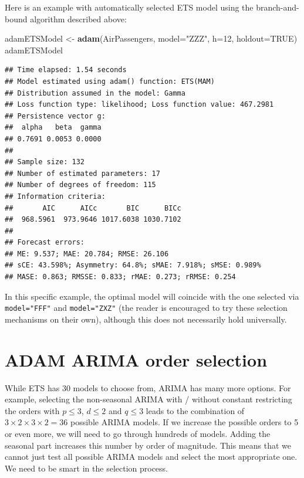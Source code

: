 \documentclass[]{book}
\newenvironment{Shaded}{\begin{snugshade}}{\end{snugshade}}
\newcommand{\DataTypeTok}[1]{\textcolor[rgb]{0.13,0.29,0.53}{#1}}
\newcommand{\DecValTok}[1]{\textcolor[rgb]{0.00,0.00,0.81}{#1}}
\newcommand{\KeywordTok}[1]{\textcolor[rgb]{0.13,0.29,0.53}{\textbf{#1}}}
\newcommand{\NormalTok}[1]{#1}
\newcommand{\OtherTok}[1]{\textcolor[rgb]{0.56,0.35,0.01}{#1}}
\newcommand{\StringTok}[1]{\textcolor[rgb]{0.31,0.60,0.02}{#1}}
\theoremstyle{definition}
\theoremstyle{definition}
\theoremstyle{definition}
\theoremstyle{definition}
\theoremstyle{remark}
\begin{document}
Here is an example with automatically selected ETS model using the branch-and-bound algorithm described above:

\begin{Shaded}
\begin{Highlighting}[]
\NormalTok{adamETSModel <-}\StringTok{ }\KeywordTok{adam}\NormalTok{(AirPassengers, }\DataTypeTok{model=}\StringTok{"ZZZ"}\NormalTok{, }\DataTypeTok{h=}\DecValTok{12}\NormalTok{, }\DataTypeTok{holdout=}\OtherTok{TRUE}\NormalTok{)}
\NormalTok{adamETSModel}
\end{Highlighting}
\end{Shaded}

\begin{verbatim}
## Time elapsed: 1.54 seconds
## Model estimated using adam() function: ETS(MAM)
## Distribution assumed in the model: Gamma
## Loss function type: likelihood; Loss function value: 467.2981
## Persistence vector g:
##  alpha   beta  gamma 
## 0.7691 0.0053 0.0000 
## 
## Sample size: 132
## Number of estimated parameters: 17
## Number of degrees of freedom: 115
## Information criteria:
##       AIC      AICc       BIC      BICc 
##  968.5961  973.9646 1017.6038 1030.7102 
## 
## Forecast errors:
## ME: 9.537; MAE: 20.784; RMSE: 26.106
## sCE: 43.598%; Asymmetry: 64.8%; sMAE: 7.918%; sMSE: 0.989%
## MASE: 0.863; RMSSE: 0.833; rMAE: 0.273; rRMSE: 0.254
\end{verbatim}

In this specific example, the optimal model will coincide with the one selected via \texttt{model="FFF"} and \texttt{model="ZXZ"} (the reader is encouraged to try these selection mechanisms on their own), although this does not necessarily hold universally.

\hypertarget{ARIMASelection}{%
\section{ADAM ARIMA order selection}\label{ARIMASelection}}

While ETS has 30 models to choose from, ARIMA has many more options. For example, selecting the non-seasonal ARIMA with / without constant restricting the orders with \(p \leq 3\), \(d \leq 2\) and \(q \leq 3\) leads to the combination of \(3 \times 2 \times 3 \times 2 = 36\) possible ARIMA models. If we increase the possible orders to 5 or even more, we will need to go through hundreds of models. Adding the seasonal part increases this number by order of magnitude. This means that we cannot just test all possible ARIMA models and select the most appropriate one. We need to be smart in the selection process.
\end{document}
